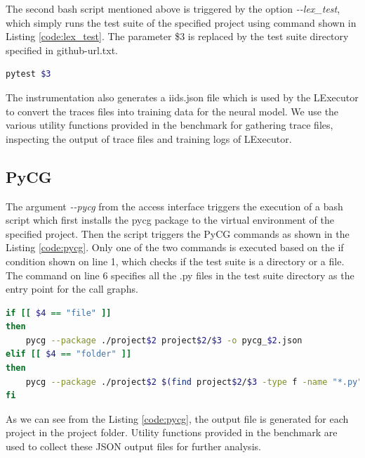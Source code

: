 The second bash script mentioned above is triggered by the option \textit{\--\--lex\_test}, which simply runs the test suite of the specified project using command shown in Listing \ref{code:lex_test}.
The parameter \$3 is replaced by the test suite directory specified in github-url.txt.
\begin{lstlisting}[caption=LExecutor Test Suite Execution,label=code:lex_test,language=Bash]
pytest $3
\end{lstlisting}

The instrumentation also generates a iids.json file which is used by the LExecutor to convert the traces files into training data for the neural model.
We use the various utility functions provided in the benchmark for gathering trace files, inspecting the output of trace files and training logs of LExecutor.

\subsection{PyCG}
The argument \textit{\--\--pycg} from the access interface triggers the execution of a bash script which first installs the pycg package to the virtual environment of the specified project.
Then the script triggers the PyCG commands as shown in the Listing \ref{code:pycg}.
Only one of the two commands is executed based on the if condition shown on line 1, which checks if the test suite is a directory or a file.
The command on line 6 specifies all the .py files in the test suite directory as the entry point for the call graphs.
\begin{lstlisting}[caption=PyCG Execution,label=code:pycg,language=Bash]
if [[ $4 == "file" ]]
then
    pycg --package ./project$2 project$2/$3 -o pycg_$2.json
elif [[ $4 == "folder" ]]
then
    pycg --package ./project$2 $(find project$2/$3 -type f -name "*.py") -o pycg_$2.json
fi
\end{lstlisting}

As we can see from the Listing \ref{code:pycg}, the output file is generated for each project in the project folder.
Utility functions provided in the benchmark are used to collect these JSON output files for further analysis.  

